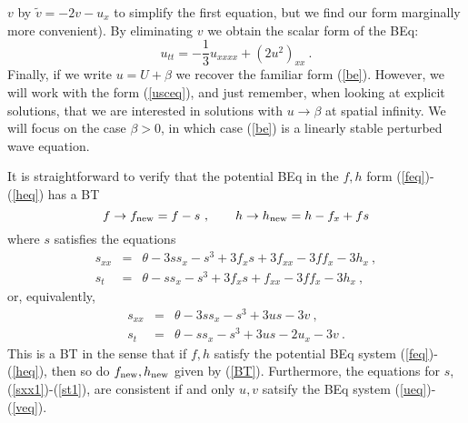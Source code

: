 \documentclass[12pt]{article}
\begin{document}
$v$ by $\tilde{v}=-2v-u_x$ to simplify the first equation, but we find our form marginally more convenient). 
By eliminating $v$ we obtain the scalar form of the BEq: 
\begin{equation}
u_{tt} = -{\textstyle{\frac13}} u_{xxxx} + (2u^2)_{xx}  \ .
\label{usceq}\end{equation}
Finally, if we write $u=U+\beta$ we recover the familiar form (\ref{be}). However, we will work  with
the form (\ref{usceq}), and just remember, when looking at explicit solutions, that we are interested
in solutions with $u\rightarrow \beta$ at spatial infinity. We will focus on
the case $\beta>0$, in which case (\ref{be}) is a linearly stable perturbed wave equation. 

It is straightforward to verify that 
the potential BEq in the $f,h$ form (\ref{feq})-(\ref{heq}) has a BT 
\begin{equation}
  f \rightarrow f_{\rm new} = f - s \ , \qquad  h \rightarrow h_{\rm new} = h - f_x + f s
\label{BT}  \end{equation}
where $s$ satisfies the equations 
\begin{eqnarray}
  s_{xx} &=&  \theta  -  3ss_x  - s^3 + 3f_x s  + 3f_{xx} - 3ff_x - 3h_x\ ,  \label{sxx}\\
  s_{t}  &=&  \theta  -   ss_x  - s^3 + 3f_x s  + f_{xx} - 3ff_x - 3h_x\ ,   \label{st}
\end{eqnarray}
or, equivalently,
\begin{eqnarray}
  s_{xx} &=&  \theta  -  3ss_x  - s^3 + 3u s  -3v\ ,  \label{sxx1}\\
  s_{t}  &=&  \theta  -   ss_x  - s^3 + 3u s  - 2u_x - 3v\ .   \label{st1} 
\end{eqnarray}
This is a BT in the sense that if $f,h$ satisfy the potential BEq system (\ref{feq})-(\ref{heq}), then so do
$f_{\rm new},h_{\rm new}$ given by (\ref{BT}). Furthermore, the equations for $s$, (\ref{sxx1})-(\ref{st1}), 
are consistent if and only $u,v$ satsify the BEq system (\ref{ueq})-(\ref{veq}). 
\end{document}
